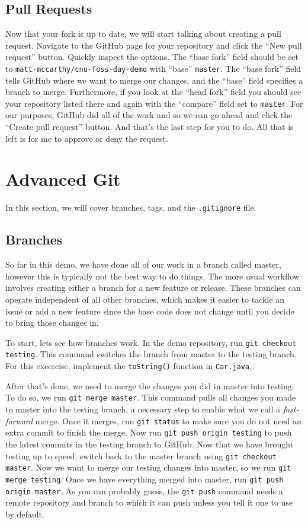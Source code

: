 \documentclass[notitlepage]{simple}
\begin{document}
\subsection{Pull Requests}

Now that your fork is up to date, we will start talking about creating a pull request.
Navigate to the GitHub page for your repository and click the ``New pull request'' button.
Quickly inspect the options.
The ``base fork'' field should be set to \verb|matt-mccarthy/cnu-foss-day-demo| with ``base'' \verb|master|.
The ``base fork'' field tells GitHub where we want to merge our changes, and the ``base'' field specifies a branch to merge.
Furthermore, if you look at the ``head fork'' field you should see your repository listed there and again with the ``compare'' field set to \verb|master|.
For our purposes, GitHub did all of the work and so we can go ahead and click the ``Create pull request'' button.
And that's the last step for you to do.
All that is left is for me to approve or deny the request.

\section{Advanced Git}

In this section, we will cover branches, tags, and the \verb|.gitignore| file.

\subsection{Branches}

So far in this demo, we have done all of our work in a branch called master, however this is typically not the best way to do things.
The more usual workflow involves creating either a branch for a new feature or release.
These branches can operate independent of all other branches, which makes it easier to tackle an issue or add a new feature since the base code does not change until you decide to bring those changes in.

To start, lets see how branches work.
In the demo repository, run \verb|git checkout testing|.
This command switches the branch from master to the testing branch.
For this excercise, implement the \verb|toString()| function in \verb|Car.java|.

After that's done, we need to merge the changes you did in master into testing.
To do so, we run \verb|git merge master|.
This command pulls all changes you made to master into the testing branch, a necessary step to enable what we call a \textit{fast-forward} merge.
Once it merges, run \verb|git status| to make sure you do not need an extra commit to finish the merge.
Now run \verb|git push origin testing| to push the latest commits in the testing branch to GitHub.
Now that we have brought testing up to speed, switch back to the master branch using \verb|git checkout master|.
Now we want to merge our testing changes into master, so we run \verb|git merge testing|.
Once we have everything merged into master, run \verb|git push origin master|.
As you can probably guess, the \verb|git push| command needs a remote repository and branch to which it can push unless you tell it one to use by default.
\end{document}
